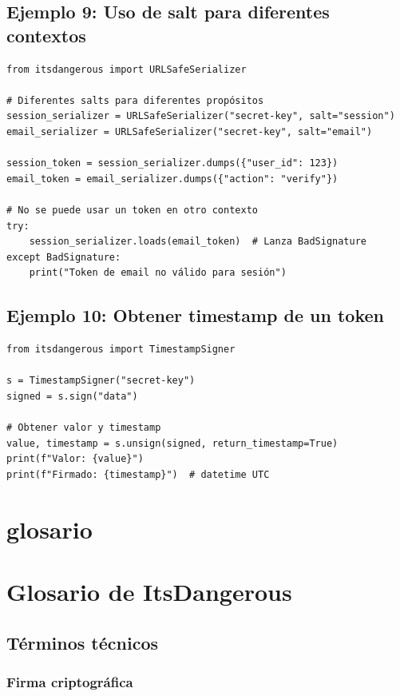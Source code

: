 \documentclass[11pt,a4paper]{article}
\begin{document}
\subsection*{Ejemplo 9: Uso de salt para diferentes contextos}


\begin{lstlisting}
from itsdangerous import URLSafeSerializer

# Diferentes salts para diferentes propósitos
session_serializer = URLSafeSerializer("secret-key", salt="session")
email_serializer = URLSafeSerializer("secret-key", salt="email")

session_token = session_serializer.dumps({"user_id": 123})
email_token = email_serializer.dumps({"action": "verify"})

# No se puede usar un token en otro contexto
try:
    session_serializer.loads(email_token)  # Lanza BadSignature
except BadSignature:
    print("Token de email no válido para sesión")
\end{lstlisting}


\subsection*{Ejemplo 10: Obtener timestamp de un token}


\begin{lstlisting}
from itsdangerous import TimestampSigner

s = TimestampSigner("secret-key")
signed = s.sign("data")

# Obtener valor y timestamp
value, timestamp = s.unsign(signed, return_timestamp=True)
print(f"Valor: {value}")
print(f"Firmado: {timestamp}")  # datetime UTC
\end{lstlisting}


\section*{glosario}

\section*{Glosario de ItsDangerous}


\subsection*{Términos técnicos}


\subsubsection*{Firma criptográfica}
\end{document}
